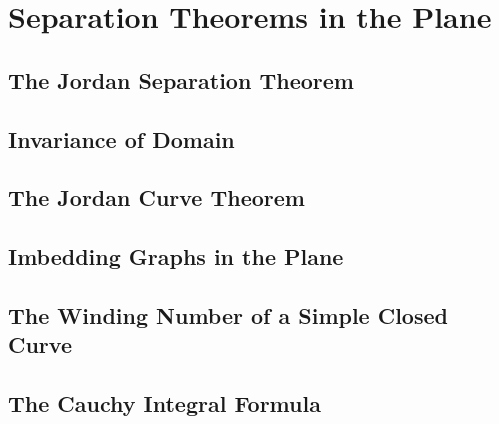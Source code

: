 \chapter{Separation Theorems in the Plane}

\section{The Jordan Separation Theorem}

\section{Invariance of Domain}

\section{The Jordan Curve Theorem}

\section{Imbedding Graphs in the Plane}

\section{The Winding Number of a Simple Closed Curve}

\section{The Cauchy Integral Formula}
